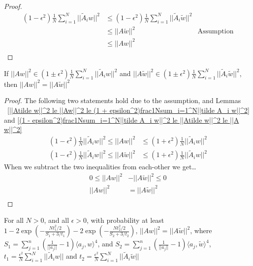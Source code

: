 \begin{proof}
    \begin{align*}
        (1 - \epsilon^2)\frac{1}{N}\sum_{i=1}^N||\tilde A_i w||^2 & \le (1 - \epsilon^2)\frac{1}{N}\sum_{i=1}^N||\tilde A_i \tilde w||^2\\
        &\le ||A\tilde w||^2 & \text{Assumption}\\
        &\le ||Aw||^2 &\\
    \end{align*}
\end{proof}

\begin{lemma}
\label{||Aw||^2 = ||Atilde w||^2}
    If $||Aw||^2 \in (1 \pm \epsilon^2)\frac{1}{N}\sum_{i=1}^N||\tilde A_i w||^2$ and $||A\tilde w||^2 \in (1 \pm \epsilon^2)\frac{1}{N}\sum_{i=1}^N||\tilde A_i \tilde w||^2$, then $||Aw||^2 = ||A\tilde w||^2$
\end{lemma}

\begin{proof}
    The following two statements hold due to the assumption, and Lemmas ~\ref{||Atilde w||^2 le ||Aw||^2 le (1 + epsilon^2)frac1Nsum_i=1^N||tilde A_i w||^2} and \ref{(1 - epsilon^2)frac1Nsum_i=1^N||tilde A_i w||^2 le ||Atilde w||^2 le ||A w||^2}
    \begin{align}
        (1 - \epsilon^2)\frac{1}{N}||\tilde A_i w||^2 \le ||Aw||^2&\le (1 + \epsilon^2)\frac{1}{N}||\tilde A_i w||^2 \\
        (1 - \epsilon^2)\frac{1}{N}||\tilde A_i w||^2 \le ||A\tilde w||^2 &\le (1 + \epsilon^2)\frac{1}{N}||\tilde A_i w||^2
    \end{align}
    When we subtract the two inequalities from each-other we get\dots
    \begin{align*}
        0 \le ||Aw||^2 &- ||A\tilde w||^2 \le 0\\
        ||Aw||^2 &= ||A\tilde w||^2\\
    \end{align*}
\end{proof}

\begin{lemma}
    For all $N > 0$, and all $\epsilon > 0$, with probability at least $1 - 2 \exp\left(- \frac{Nt_1^2/2}{S_1 + 3/t_1}\right) - 2 \exp\left(- \frac{Nt_2^2/2}{S_2 + 3/t_2}\right)$, $||Aw||^2 = ||A \tilde w||^2$, where $S_1 = \sum_{j=1}^n (\frac{1}{||a_j||} - 1)  \langle a_j, w\rangle ^4$, and $S_2 = \sum_{j=1}^n (\frac{1}{||a_j||} - 1)  \langle a_j, \tilde w\rangle ^4$, $t_1 = \frac{\epsilon^2}{N}\sum_{i=1}^N||\tilde A_iw||$ and $t_2 = \frac{\epsilon^2}{N}\sum_{i=1}^N||\tilde A_i \tilde w||$
\end{lemma}

